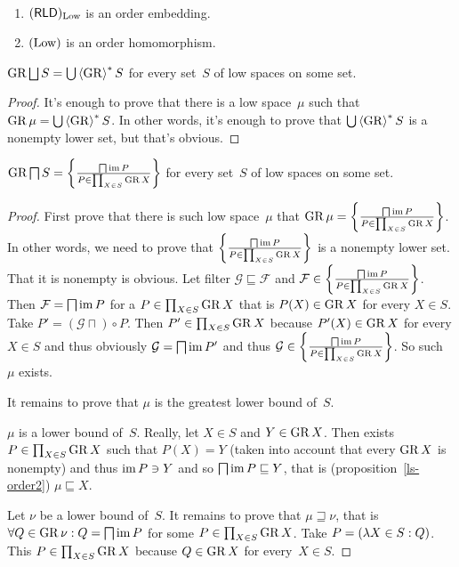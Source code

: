 \begin{obvious}
~
\begin{enumerate}
\item $(\mathsf{RLD})_{\operatorname{Low}}$ is an order embedding.
\item $(\operatorname{Low})$ is an order homomorphism.
\end{enumerate}
\end{obvious}

\begin{prop}
$\GR\bigsqcup S=\bigcup\rsupfun{\GR}S$ for every set~$S$ of low spaces on some set.
\end{prop}

\begin{proof}
It's enough to prove that there is a low space~$\mu$ such that $\operatorname{GR}\mu=\bigcup\left\langle \operatorname{GR}\right\rangle ^{\ast}S$. In other words, it's enough to prove
that $\bigcup\left\langle \operatorname{GR}\right\rangle ^{\ast}S$ is a nonempty lower set, but that's obvious. 
\end{proof}

\begin{prop}
$\operatorname{GR}\bigsqcap S=\left\{ \frac{\bigsqcap\operatorname{im} P}{P\in\prod_{X\in S}\operatorname{GR} X}\right\}$ for every set~$S$ of low spaces on some set.
\end{prop}

\begin{proof}
First prove that there is such low space~$\mu$ that $\operatorname{GR}\mu=\left\{ \frac{\bigsqcap\operatorname{im} P}{P\in\prod_{X\in S}\operatorname{GR} X}\right\}$. In other words,
we need to prove that $\left\{ \frac{\bigsqcap\operatorname{im} P}{P\in\prod_{X\in S}\operatorname{GR} X}\right\}$ is a nonempty lower set. That it is nonempty is obvious.
Let filter $\mathcal{G}\sqsubseteq\mathcal{F}$ and $\mathcal{F}\in\left\{ \frac{\bigsqcap\operatorname{im} P}{P\in\prod_{X\in S}\operatorname{GR} X}\right\}$. Then
$\mathcal{F}=\bigsqcap\operatorname{im} P$ for a $P\in\prod_{X\in S}\operatorname{GR} X$ that is $P(X)\in\operatorname{GR} X$ for every $X\in S$. Take $P'=(\mathcal{G}\sqcap)\circ P$.
Then $P'\in\prod_{X\in S}\operatorname{GR} X$ because $P'(X)\in\operatorname{GR} X$ for every $X\in S$ and thus
obviously $\mathcal{G}=\bigsqcap\operatorname{im} P'$ and thus $\mathcal{G}\in\left\{ \frac{\bigsqcap\operatorname{im} P}{P\in\prod_{X\in S}\operatorname{GR} X}\right\}$. So such~$\mu$ exists.

It remains to prove that $\mu$ is the greatest lower bound of~$S$.

$\mu$ is a lower bound of~$S$. Really, let $X\in S$ and $Y\in\operatorname{GR} X$.
Then exists $P\in\prod_{X\in S}\operatorname{GR} X$ such that $P(X)=Y$ (taken into account that every $\operatorname{GR} X$ is nonempty)
and thus $\operatorname{im} P\ni Y$ and so $\bigsqcap\operatorname{im} P\sqsubseteq Y$, that is (proposition~\ref{ls-order2}) $\mu\sqsubseteq X$.

Let $\nu$ be a lower bound of~$S$. It remains to prove that $\mu\sqsupseteq\nu$, that is
$\forall Q\in\operatorname{GR}\nu: Q=\bigsqcap\operatorname{im} P$ for some $P\in\prod_{X\in S}\operatorname{GR} X$.
Take $P=(\lambda X\in S:Q)$. This $P\in\prod_{X\in S}\operatorname{GR} X$ because $Q\in\operatorname{GR} X$ for every~$X\in S$.
\end{proof}

